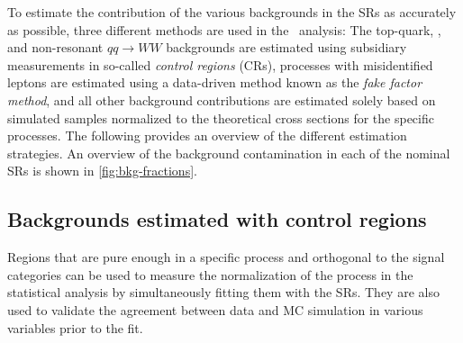 To estimate the contribution of the various backgrounds in the SRs as accurately as possible, three different methods are used in the \HWW\ analysis:
The top-quark, \Zgamma, and non-resonant $qq \to WW$ backgrounds are estimated using subsidiary measurements in so-called \emph{control regions} (CRs), processes with misidentified leptons are estimated using a data-driven method known as the \emph{fake factor method}, and all other background contributions are estimated solely based on simulated samples normalized to the theoretical cross sections for the specific processes.
The following provides an overview of the different estimation strategies. 
An overview of the background contamination in each of the nominal SRs is shown in \cref{fig:bkg-fractions}. 

\subsection{Backgrounds estimated with control regions}
Regions that are pure enough in a specific process and orthogonal to the signal categories can be used to measure the normalization of the process in the statistical analysis by simultaneously fitting them with the SRs. 
They are also used to validate the agreement between data and MC simulation in various variables prior to the fit.

